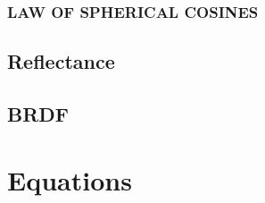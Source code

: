 \documentclass{article}
\begin{document}
\subsubsection{LAW OF SPHERICAL COSINES}


\subsection{Reflectance}

\subsection{BRDF}







\section{Equations}



\end{document}

